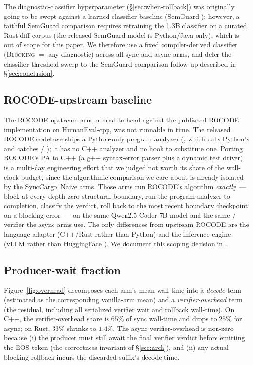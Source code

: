 The diagnostic-classifier hyperparameter (\S\ref{sec:when-rollback})
was originally going to be swept against a learned-classifier
baseline (SemGuard \citep{wang2025semguard}); however, a faithful
SemGuard comparison requires retraining the 1.3B classifier on a
curated Rust diff corpus (the released SemGuard model is
Python/Java only), which is out of scope for this paper. We
therefore use a fixed compiler-derived classifier (\textsc{Blocking}
$=$ any  diagnostic) across all sync and async
arms, and defer the classifier-threshold sweep to the
SemGuard-comparison follow-up described in
\S\ref{sec:conclusion}.

\subsection{ROCODE-upstream baseline}\label{sec:results-rocode}

The ROCODE-upstream arm, a head-to-head against the published
ROCODE \citep{jiang2024rocode} implementation on HumanEval-cpp,
was not runnable in time. The released ROCODE codebase ships a
Python-only program analyzer (, which calls
Python's  and catches  /
); it has no C++ analyzer and no hook to
substitute one. Porting ROCODE's PA to C++ (a g++ syntax-error
parser plus a dynamic test driver) is a multi-day engineering
effort that we judged not worth its share of the wall-clock budget,
since the algorithmic comparison we care about is already isolated
by the \textsf{SyncCargo~Naive} arms. Those arms run ROCODE's
algorithm \emph{exactly}~--- block at every depth-zero structural
boundary, run the program analyzer to completion, classify the
verdict, roll back to the most recent boundary checkpoint on a
blocking error~--- on the same Qwen2.5-Coder-7B model and the same
/ verifier the async arms
use. The only differences from upstream ROCODE are the language
adapter (C++/Rust rather than Python) and the inference engine
(vLLM rather than HuggingFace ). We document
this scoping decision in
.

\subsection{Producer-wait fraction}\label{sec:results-wait}

Figure~\ref{fig:overhead} decomposes each arm's mean wall-time into
a \emph{decode} term (estimated as the corresponding vanilla-arm
mean) and a \emph{verifier-overhead} term (the residual, including
all serialized verifier wait and rollback wall-time). On C++, the
verifier-overhead share is $65\%$ of sync wall-time and drops to
$25\%$ for async; on Rust, $33\%$ shrinks to $1.4\%$. The async
verifier-overhead is non-zero because (i) the producer must still
await the final verifier verdict before emitting the EOS token (the
correctness invariant of \S\ref{sec:arch}), and (ii) any actual
blocking rollback incurs the discarded suffix's decode time.

